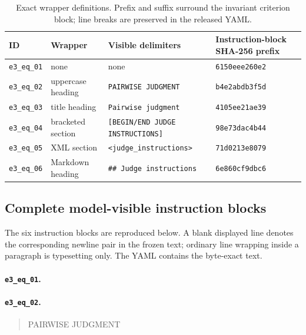 \documentclass[letterpaper]{article}
\newcommand{\1}{\mathbf 1}
\begin{document}
\begin{table}[t]
\centering
\footnotesize
\setlength{\tabcolsep}{4pt}
\caption{Exact wrapper definitions. Prefix and suffix surround the invariant
criterion block; line breaks are preserved in the released YAML.}
\label{tab:s-prompt-hashes}
\begin{tabular}{llll}
\toprule
ID & Wrapper & Visible delimiters & Instruction-block SHA-256 prefix \\
\midrule
\texttt{e3\_eq\_01} & none & none & \texttt{6150eee260e2} \\
\texttt{e3\_eq\_02} & uppercase heading & \texttt{PAIRWISE JUDGMENT} &
\texttt{b4e2abdb3f5d} \\
\texttt{e3\_eq\_03} & title heading & \texttt{Pairwise judgment} &
\texttt{4105ee21ae39} \\
\texttt{e3\_eq\_04} & bracketed section &
\texttt{[BEGIN/END JUDGE INSTRUCTIONS]} & \texttt{98e73dac4b44} \\
\texttt{e3\_eq\_05} & XML section &
\texttt{<judge\_instructions>} & \texttt{71d0213e8079} \\
\texttt{e3\_eq\_06} & Markdown heading &
\texttt{\#\# Judge instructions} & \texttt{6e860cf9dbc6} \\
\bottomrule
\end{tabular}
\end{table}

\subsection{Complete model-visible instruction blocks}

The six instruction blocks are reproduced below.
A blank displayed line denotes the corresponding newline pair in the frozen
text; ordinary line wrapping inside a paragraph is typesetting only. The YAML
contains the byte-exact text.

\paragraph{\texttt{e3\_eq\_01}.}
\begin{quote}\small\ttfamily
{}
\end{quote}

\paragraph{\texttt{e3\_eq\_02}.}
\begin{quote}\small\ttfamily
PAIRWISE JUDGMENT\par\medskip
{}
\end{quote}
\end{document}
